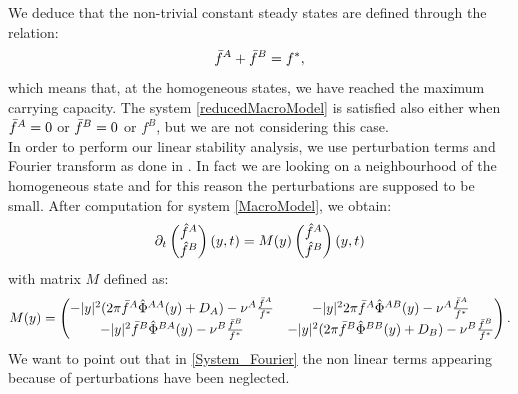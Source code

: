 We deduce that the non-trivial constant steady states are defined through the relation:
\begin{equation}
 {\bar{f}^A}+{\bar{f}^B}={f^{*}},
\end{equation}
which means that, at the homogeneous states, we have reached the maximum carrying capacity. 
The system \eqref{reducedMacroModel} is satisfied also either when ${\bar{f}^A}=0$ or ${\bar{f}^B}=0$ or $f^B$, but we are not considering this case. \\
In order to perform our linear stability analysis, we use perturbation terms and Fourier transform as done in \cite{twoparticule}. In fact we are looking on a neighbourhood of the homogeneous state and for this reason the perturbations are supposed to be small. 
After computation for system \eqref{MacroModel}, we obtain: 
\begin{align}
{\partial}_t \begin{pmatrix} {\hat{f}^{A}} \\ {\hat{f}^{B}}
\end{pmatrix}(y,t)=M(y)\begin{pmatrix} {\hat{f}^{A}} \\ {\hat{f}^{B}}
\end{pmatrix}(y,t)
\label{System_Fourier}
\end{align}
with matrix $M$ defined as:
\begin{align}
M(y)=
 \begin{pmatrix} -|y|^2(2\pi{\bar{f}^A}{\hat{\Phi}^{AA}}(y)+D_A)-{\nu^A}\frac{{\bar{f}^A}}{{f^{*}}} & -|y|^22\pi{\bar{f}^A}{\hat{\Phi}^{AB}}(y)-{\nu^A}\frac{{\bar{f}^A}}{{f^{*}}} \\ 
-|y|^2{\bar{f}^B}{\hat{\Phi}^{BA}}(y)-{\nu^B}\frac{{\bar{f}^B}}{{f^{*}}} & -|y|^2(2\pi{\bar{f}^B}{\hat{\Phi}^{BB}}(y)+D_B)-{\nu^B}\frac{{\bar{f}^B}}{{f^{*}}} 
\end{pmatrix}.
\end{align}
We want to point out that in \eqref{System_Fourier} the non linear terms appearing because of perturbations have been neglected.
